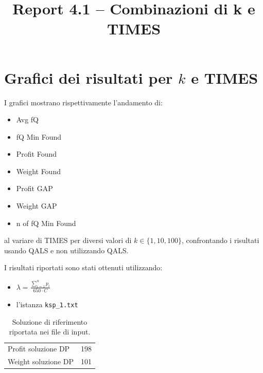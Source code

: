 \documentclass[a4paper,12pt]{article}
\title{Report 4.1 -- Combinazioni di k e TIMES}
\begin{document}
\maketitle

\newpage

\section{Grafici dei risultati per $k$ e TIMES}

I grafici mostrano rispettivamente l'andamento di:
\begin{itemize}
    \item Avg fQ
    \item fQ Min Found
    \item Profit Found
    \item Weight Found
    \item Profit GAP
    \item Weight GAP
    \item n of fQ Min Found
\end{itemize}
al variare di TIMES per diversi valori di $k \in \{1,10,100\}$, confrontando
i risultati usando QALS e non utilizzando QALS.

I risultati riportati sono stati ottenuti utilizzando:

\begin{itemize}
    \item $\lambda = \frac{\sum_{i=1}^{n} p_i}{650 \cdot C}$
    \item l'istanza \texttt{ksp\_1.txt}
\end{itemize}

\begin{table}[H]
\centering
\begin{tabular}{lc}
\hline
Profit soluzione DP & 198 \\
Weight soluzione DP & 101 \\
\hline
\end{tabular}
\caption{Soluzione di riferimento riportata nei file di input.}
\label{tab:knapsack-solution}
\end{table}
\end{document}
